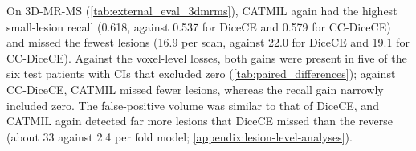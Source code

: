 \begin{table}[t]
\centering
\caption{Comparison of CATMIL with standard losses and the instance-level
loss CC-DiceCE on the 3D-MR-MS test set. Formatting as in
\cref{tab:loss_comparison_small_lesion}.}
\label{tab:external_eval_3dmrms}
\end{table}

On 3D-MR-MS (\cref{tab:external_eval_3dmrms}), CATMIL again had the
highest small-lesion recall (0.618, against 0.537 for DiceCE and 0.579 for
CC-DiceCE) and missed the fewest lesions (16.9 per scan, against 22.0 for
DiceCE and 19.1 for CC-DiceCE). Against the voxel-level
losses, both gains were present in five of the six test patients with CIs
that excluded zero (\cref{tab:paired_differences}); against CC-DiceCE,
CATMIL missed fewer lesions, whereas the recall gain narrowly included
zero. The false-positive volume was similar to that of DiceCE, and CATMIL
again detected far more lesions that DiceCE missed than the reverse (about
33 against 2.4 per fold model; \cref{appendix:lesion-level-analyses}).

